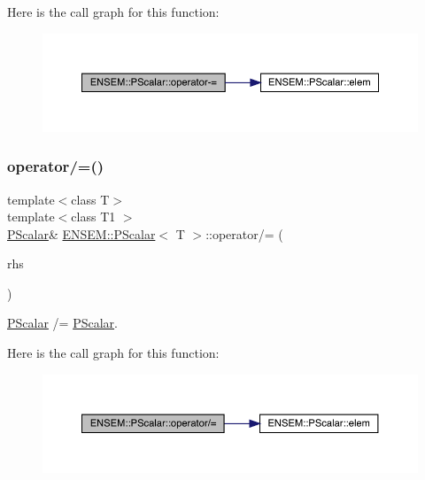 Here is the call graph for this function\+:
\nopagebreak
\begin{figure}[H]
\begin{center}
\leavevmode
\includegraphics[width=350pt]{d3/d27/classENSEM_1_1PScalar_a8c0e633dbd87bcb922496bfaf136752c_cgraph}
\end{center}
\end{figure}
\mbox{\label{classENSEM_1_1PScalar_a72bf5e7494fc6c8831d0003f8fb62a16}} 
\subsubsection{\texorpdfstring{operator/=()}{operator/=()}\hspace{0.1cm}{\footnotesize\ttfamily [1/2]}}
{\footnotesize\ttfamily template$<$class T$>$ \\
template$<$class T1 $>$ \\
\mbox{\hyperlink{classENSEM_1_1PScalar}{P\+Scalar}}\& \mbox{\hyperlink{classENSEM_1_1PScalar}{E\+N\+S\+E\+M\+::\+P\+Scalar}}$<$ T $>$\+::operator/= (\begin{DoxyParamCaption}\item[{const \mbox{\hyperlink{classENSEM_1_1PScalar}{P\+Scalar}}$<$ T1 $>$ \&}]{rhs }\end{DoxyParamCaption})\hspace{0.3cm}{\ttfamily [inline]}}



\mbox{\hyperlink{classENSEM_1_1PScalar}{P\+Scalar}} /= \mbox{\hyperlink{classENSEM_1_1PScalar}{P\+Scalar}}. 

Here is the call graph for this function\+:
\nopagebreak
\begin{figure}[H]
\begin{center}
\leavevmode
\includegraphics[width=350pt]{d3/d27/classENSEM_1_1PScalar_a72bf5e7494fc6c8831d0003f8fb62a16_cgraph}
\end{center}
\end{figure}
\mbox{\label{classENSEM_1_1PScalar_a72bf5e7494fc6c8831d0003f8fb62a16}} 
